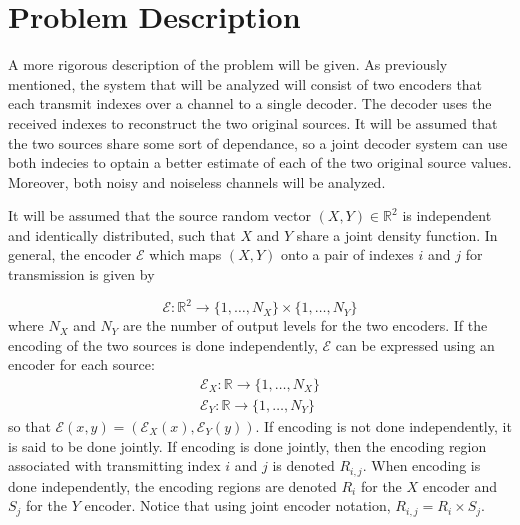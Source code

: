 \documentclass[10pt]{article}
\newcommand{\real}{\mathbb{R}}
\begin{document}
\section{Problem Description}

A more rigorous description of the problem will be given. As previously mentioned, the system that will be analyzed will consist of two encoders that each transmit indexes over a channel to a single decoder. The decoder uses the received indexes to reconstruct the two original sources. It will be assumed that the two sources share some sort of dependance, so a joint decoder system can use both indecies to optain a better estimate of each of the two original source values. Moreover, both noisy and noiseless channels will be analyzed.

It will be assumed that the source random vector $(X,Y)\in\real^2$ is independent and identically distributed, such that $X$ and $Y$ share a joint density function. In general, the encoder $\mathcal{E}$ which maps $(X,Y)$ onto a pair of indexes $i$ and $j$ for transmission is given by

\begin{equation*}
    \mathcal{E} : \real^2\to\{1,\ldots,N_X\} \times \{1,\ldots,N_Y\}
\end{equation*}
where $N_X$ and $N_Y$ are the number of output levels for the two encoders. If the encoding of the two sources is done independently, $\mathcal{E}$ can be expressed using an encoder for each source:
\begin{gather*}
    \mathcal{E}_X : \real\to\{1,\ldots,N_X\} \\
    \mathcal{E}_Y : \real\to\{1,\ldots,N_Y\}
\end{gather*}
so that $\mathcal{E}(x,y) = (\mathcal{E}_X(x), \mathcal{E}_Y(y))$. If encoding is not done independently, it is said to be done jointly. If encoding is done jointly, then the encoding region associated with transmitting index $i$ and $j$ is denoted $R_{i,j}$. When encoding is done independently, the encoding regions are denoted $R_i$ for the $X$ encoder and $S_j$ for the $Y$ encoder. Notice that using joint encoder notation, $R_{i,j} = R_i \times S_j$.
\end{document}
